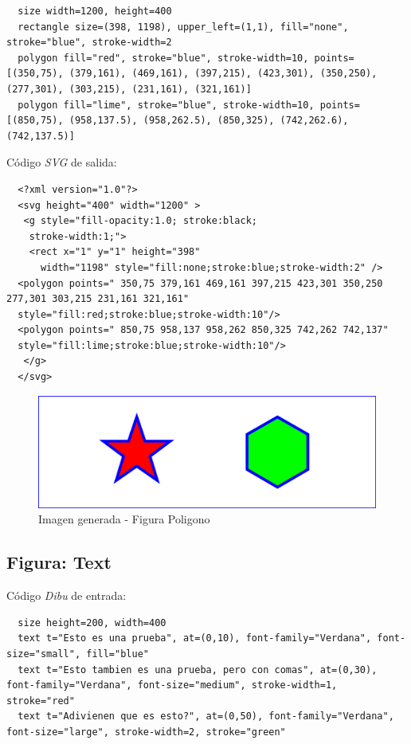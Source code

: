 \begin{lstlisting}
  size width=1200, height=400
  rectangle size=(398, 1198), upper_left=(1,1), fill="none", stroke="blue", stroke-width=2
  polygon fill="red", stroke="blue", stroke-width=10, points=[(350,75), (379,161), (469,161), (397,215), (423,301), (350,250), (277,301), (303,215), (231,161), (321,161)]
  polygon fill="lime", stroke="blue", stroke-width=10, points=[(850,75), (958,137.5), (958,262.5), (850,325), (742,262.6), (742,137.5)]
\end{lstlisting}

Código \textit{SVG} de salida:

\begin{lstlisting}
  <?xml version="1.0"?>
  <svg height="400" width="1200" >
   <g style="fill-opacity:1.0; stroke:black;
    stroke-width:1;">
    <rect x="1" y="1" height="398"
      width="1198" style="fill:none;stroke:blue;stroke-width:2" />
  <polygon points=" 350,75 379,161 469,161 397,215 423,301 350,250 277,301 303,215 231,161 321,161"
  style="fill:red;stroke:blue;stroke-width:10"/>
  <polygon points=" 850,75 958,137 958,262 850,325 742,262 742,137"
  style="fill:lime;stroke:blue;stroke-width:10"/>
   </g>
  </svg>
\end{lstlisting}


\begin{figure}[H]
\centering
\includegraphics[width=150mm]{imagenes/polygon.jpg}
\caption{Imagen generada - Figura Poligono}
\end{figure}

\subsection{\textbf{Figura:} Text}

Código \textit{Dibu} de entrada:

\begin{lstlisting}
  size height=200, width=400
  text t="Esto es una prueba", at=(0,10), font-family="Verdana", font-size="small", fill="blue"
  text t="Esto tambien es una prueba, pero con comas", at=(0,30), font-family="Verdana", font-size="medium", stroke-width=1, stroke="red"
  text t="Adivienen que es esto?", at=(0,50), font-family="Verdana", font-size="large", stroke-width=2, stroke="green"
\end{lstlisting}

